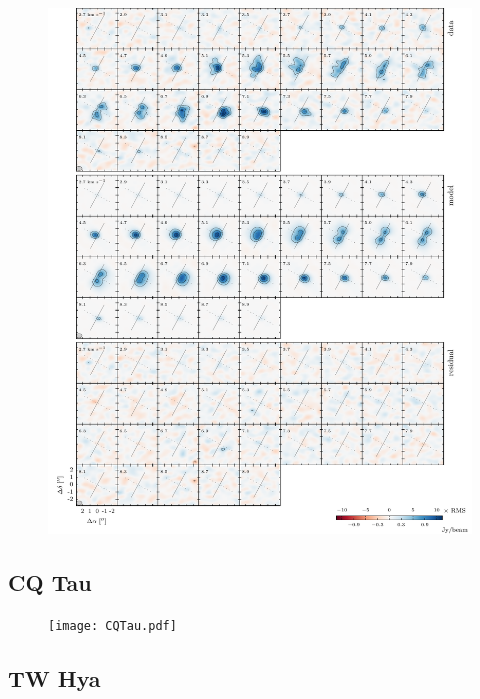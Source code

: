 \documentclass[twocolumn]{aastex6}
\begin{document}
\begin{figure}[htb]
\begin{center}
  \includegraphics{MWC758.pdf}
  \end{center}
\end{figure}

\subsection{CQ Tau}

\begin{figure}[htb]
\begin{center}
  \texttt{[image: CQTau.pdf]}
  \end{center}
\end{figure}

\subsection{TW Hya}
\end{document}
